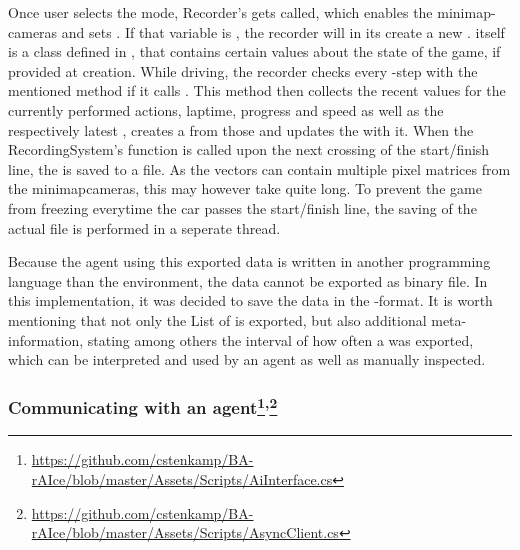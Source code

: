 Once user selects the  mode, Recorder's  gets called, which enables the minimap-cameras and sets . If that variable is , the recorder will in its  create a new .  itself is a class defined in , that contains certain values about the state of the game, if provided at creation. While driving, the recorder checks every -step with the mentioned method if it calls . This method then collects the recent values for the currently performed actions, laptime, progress and speed as well as the respectively latest , creates a  from those and updates the  with it. When the RecordingSystem's  function is called upon the next crossing of the start/finish line, the  is saved to a file. As the vectors can contain multiple pixel matrices from the minimapcameras, this may however take quite long. To prevent the game from freezing everytime the car passes the start/finish line, the saving of the actual file is performed in a seperate thread.

Because the agent using this exported data is written in another programming language than the environment, the data cannot be exported as binary file. In this implementation, it was decided to save the data in the -format. It is worth mentioning that not only the List of  is exported, but also additional meta-information, stating among others the interval of how often a  was exported, which can be interpreted and used by an agent as well as manually inspected.

\subsubsection{Communicating with an agent\footnote{\url{https://github.com/cstenkamp/BA-rAIce/blob/master/Assets/Scripts/AiInterface.cs}}\textsuperscript{,}\footnote{\label{footnoteAiInt}\url{https://github.com/cstenkamp/BA-rAIce/blob/master/Assets/Scripts/AsyncClient.cs}}}


